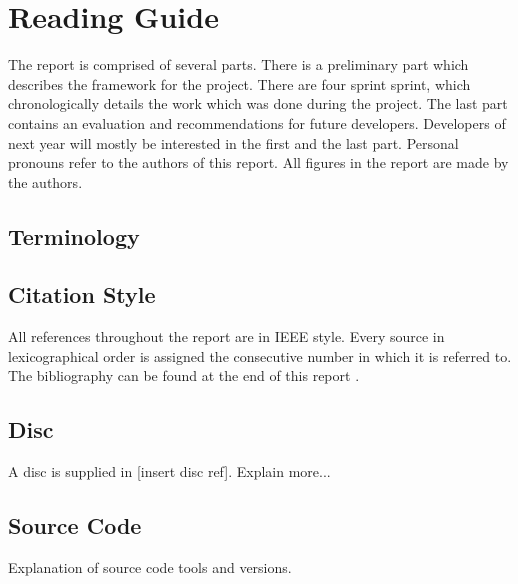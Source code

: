 \chapter*{Reading Guide}
The report is comprised of several parts. There is a preliminary part which describes the framework for the project. There are four sprint sprint, which chronologically details the work which was done during the project. The last part contains an evaluation and recommendations for future developers. Developers of next year will mostly be interested in the first and the last part. Personal pronouns refer to the authors of this report. All figures in the report are made by the authors.
\section*{Terminology}

\section*{Citation Style}
All references throughout the report are in IEEE style. Every source in lexicographical order is assigned the consecutive number in which it is referred to. The bibliography can be found at the end of this report .

\section*{Disc}
A disc is supplied in [insert disc ref]. Explain more... %

\section*{Source Code}
Explanation of source code tools and versions.

